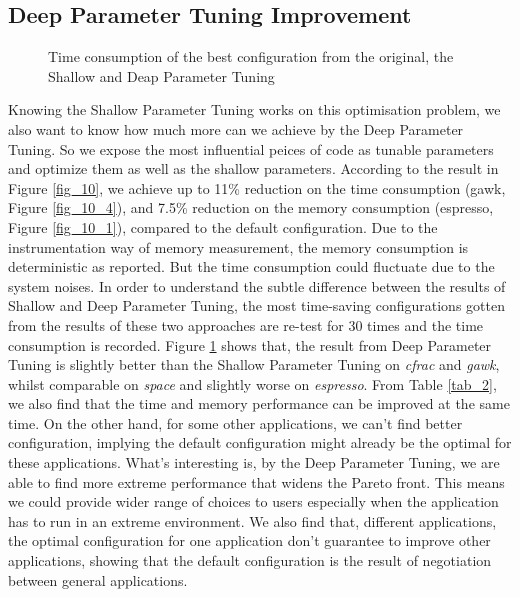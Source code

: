 \subsection{Deep Parameter Tuning Improvement}

\begin{figure}[htbp]
	\centering
	\caption{Time consumption of the best configuration from the original, the Shallow and Deap Parameter Tuning}\label{fig_sig}
\end{figure}

Knowing the Shallow Parameter Tuning works on this optimisation problem, we also want to know how much more can we achieve by the Deep Parameter Tuning. So we expose the most influential peices of code as tunable parameters and optimize them as well as the shallow parameters. According to the result in Figure \ref{fig_10}, we achieve up to 11\% reduction on the time consumption (gawk, Figure \ref{fig_10_4}), and 7.5\% reduction on the memory consumption (espresso, Figure \ref{fig_10_1}), compared to the default configuration. Due to the instrumentation way of memory measurement, the memory consumption is deterministic as reported. But the time consumption could fluctuate due to the system noises. In order to understand the subtle difference between the results of Shallow and Deep Parameter Tuning, the most time-saving configurations gotten from the results of these two approaches are re-test for 30 times and the time consumption is recorded. Figure \ref{fig_sig} shows that, the result from Deep Parameter Tuning is slightly better than the Shallow Parameter Tuning on \emph{cfrac} and \emph{gawk}, whilst comparable on \emph{space} and slightly worse on \emph{espresso}. From Table \ref{tab_2}, we also find that the time and memory performance can be improved at the same time. On the other hand, for some other applications, we can't find better configuration, implying the default configuration might already be the optimal for these applications. What's interesting is, by the Deep Parameter Tuning, we are able to find more extreme performance that widens the Pareto front. This means we could provide wider range of choices to users especially when the application has to run in an extreme environment. We also find that, different applications, the optimal configuration for one application don't guarantee to improve other applications, showing that the default configuration is the result of negotiation between general applications.

